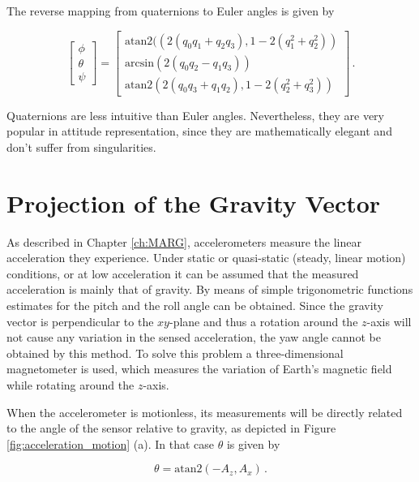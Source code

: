 \noindent
The reverse mapping from quaternions to Euler angles is given by

\begin{equation}
  \begin{bmatrix}
\phi \\ \theta \\ \psi
\end{bmatrix} =
\begin{bmatrix}
\mbox{atan}2 ((2(q_0 q_1 + q_2 q_3), 1 - 2(q_1^2 + q_2^2)) \\
\mbox{arcsin} (2(q_0 q_2 - q_1 q_3)) \\
\mbox{atan}2 (2(q_0 q_3 + q_1 q_2), 1 - 2(q_2^2 + q_3^2))
\end{bmatrix}\,.
\end{equation}

Quaternions are less intuitive than Euler angles. Nevertheless, they are very popular in attitude representation, since they are mathematically elegant and don't suffer from singularities.

\section{Projection of the Gravity Vector}\label{sec:projection_gravity}


As described in Chapter \ref{ch:MARG}, accelerometers measure the linear acceleration they experience. Under static or quasi-static (steady, linear motion) conditions, or at low acceleration it can be assumed that the measured acceleration is mainly that of gravity. By means of simple trigonometric functions estimates for the pitch and the roll angle can be obtained. Since the gravity vector is perpendicular to the $xy$-plane and thus a rotation around the $z$-axis will not cause any variation in the sensed acceleration, the yaw angle cannot be obtained by this method. To solve this problem a three-dimensional magnetometer is used, which measures the variation of Earth's magnetic field while rotating around the $z$-axis.

When the accelerometer is motionless, its measurements will be directly related to the angle of the sensor relative to gravity, as depicted in Figure \ref{fig:acceleration_motion} (a). In that case $\theta$ is given by

\begin{equation} \label{eq:projection_gravity}
  \theta = \mbox{atan}2(-A_z, A_x)\,.
\end{equation}

